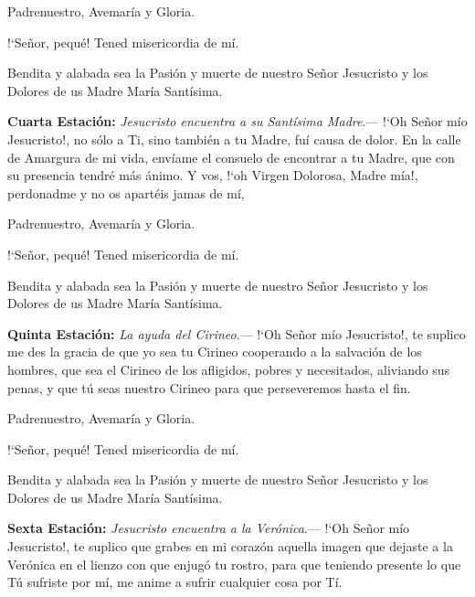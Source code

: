 Padrenuestro, Avemaría y Gloria.

{!`}Señor, pequé! Tened misericordia de mí.

Bendita y alabada sea la Pasión y muerte de nuestro Señor Jesucristo y los Dolores de us Madre María Santísima.

\vspace{2mm}

\textbf{Cuarta Estación:} \textit{Jesucristo encuentra a su Santísima Madre}.--- {!`}Oh Señor mío Jesucristo!, no sólo a Ti, sino también a tu Madre, fuí causa de dolor. En la calle de
Amargura de mi vida, envíame el consuelo de encontrar a tu Madre, que con su presencia tendré más ánimo. Y vos, {!`}oh Virgen Dolorosa, Madre mía!, perdonadme y no os apartéis jamas de mí,

\vspace{2mm}

Padrenuestro, Avemaría y Gloria.

{!`}Señor, pequé! Tened misericordia de mí.

Bendita y alabada sea la Pasión y muerte de nuestro Señor Jesucristo y los Dolores de us Madre María Santísima.

\vspace{2mm}

\textbf{Quinta Estación:} \textit{La ayuda del Cirineo}.--- {!`}Oh Señor mío Jesucristo!, te suplico me des la gracia de que yo sea tu Cirineo cooperando a la
salvación de los hombres, que sea el Cirineo de los afligidos, pobres y necesitados, aliviando sus penas, y que tú seas nuestro Cirineo para que perseveremos hasta el fin.

\vspace{2mm}

Padrenuestro, Avemaría y Gloria.

{!`}Señor, pequé! Tened misericordia de mí.

Bendita y alabada sea la Pasión y muerte de nuestro Señor Jesucristo y los Dolores de us Madre María Santísima.

\vspace{2mm}

\textbf{Sexta Estación:} \textit{Jesucristo encuentra a la Verónica}.--- {!`}Oh Señor mío Jesucristo!, te suplico que grabes en mi corazón aquella imagen que dejaste a la Verónica
en el lienzo con que enjugó tu rostro, para que teniendo presente lo que Tú sufriste por mí, me anime a sufrir cualquier cosa por Tí.

\vspace{2mm}

